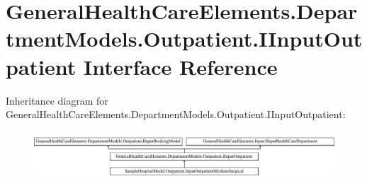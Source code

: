 \hypertarget{interface_general_health_care_elements_1_1_department_models_1_1_outpatient_1_1_i_input_outpatient}{}\section{General\+Health\+Care\+Elements.\+Department\+Models.\+Outpatient.\+I\+Input\+Outpatient Interface Reference}
\label{interface_general_health_care_elements_1_1_department_models_1_1_outpatient_1_1_i_input_outpatient}
Inheritance diagram for General\+Health\+Care\+Elements.\+Department\+Models.\+Outpatient.\+I\+Input\+Outpatient\+:\begin{figure}[H]
\begin{center}
\leavevmode
\includegraphics[height=1.814255cm]{interface_general_health_care_elements_1_1_department_models_1_1_outpatient_1_1_i_input_outpatient}
\end{center}
\end{figure}
